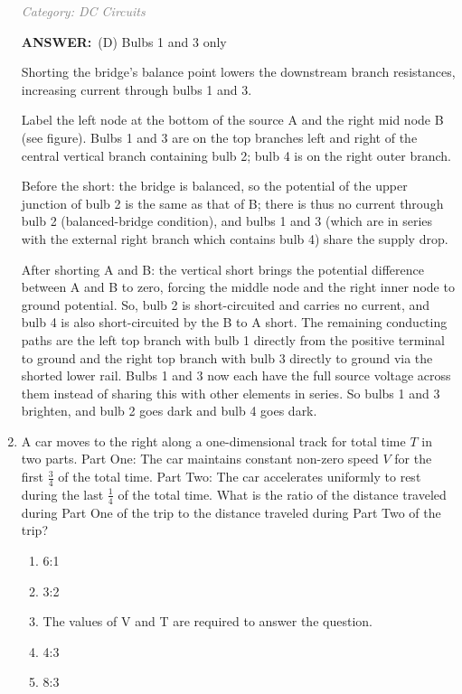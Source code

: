 \documentclass[12pt, a4paper]{article}
\makeatletter
\newcommand{\finalanswer}[1]{\textbf{ANSWER:}~#1}
\newif\if@categoryprinted
\newcommand{\category}[1]{\if@categoryprinted\relax\else\textit{\textcolor{gray}{Category: #1}}\global\@categoryprintedtrue\fi}
\newcommand{\tags}[1]{}
\makeatother
\begin{document}
\begin{CJK*}{UTF8}{gbsn}
\begin{enumerate}[itemsep=1.0em, topsep=0.6em]
\category{DC Circuits} \tags{}
\begin{answerbox}
\finalanswer{(D) Bulbs 1 and 3 only}
\end{answerbox}
\begin{insightbox}
Shorting the bridge's balance point lowers the downstream branch resistances, increasing current through bulbs 1 and 3.
\end{insightbox}
\begin{solutionbox}

Label the left node at the bottom of the source A and the right mid node B (see figure). Bulbs 1 and 3 are on the top branches left and right of the central vertical branch containing bulb 2; bulb 4 is on the right outer branch.

Before the short: the bridge is balanced, so the potential of the upper junction of bulb 2 is the same as that of B; there is thus no current through bulb 2 (balanced-bridge condition), and bulbs 1 and 3 (which are in series with the external right branch which contains bulb 4) share the supply drop.

After shorting A and B: the vertical short brings the potential difference between A and B to zero, forcing the middle node and the right inner node to ground potential. So, bulb 2 is short-circuited and carries no current, and bulb 4 is also short-circuited by the B to A short. The remaining conducting paths are the left top branch with bulb 1 directly from the positive terminal to ground and the right top branch with bulb 3 directly to ground via the shorted lower rail. Bulbs 1 and 3 now each have the full source voltage across them instead of sharing this with other elements in series. So bulbs 1 and 3 brighten, and bulb 2 goes dark and bulb 4 goes dark.
\end{solutionbox}

\item \label{prob:10}
A car moves to the right along a one-dimensional track for total time $T$ in two parts. Part One: The car maintains constant non-zero speed $V$ for the first $\tfrac{3}{4}$ of the total time. Part Two: The car accelerates uniformly to rest during the last $\tfrac{1}{4}$ of the total time. What is the ratio of the distance traveled during Part One of the trip to the distance traveled during Part Two of the trip?
\begin{enumerate}[label=(\Alph*)]
    \item 6:1
    \item 3:2
    \item The values of V and T are required to answer the question.
    \item 4:3
    \item 8:3
\end{enumerate}


\end{enumerate}
\end{CJK*}
\end{document}
